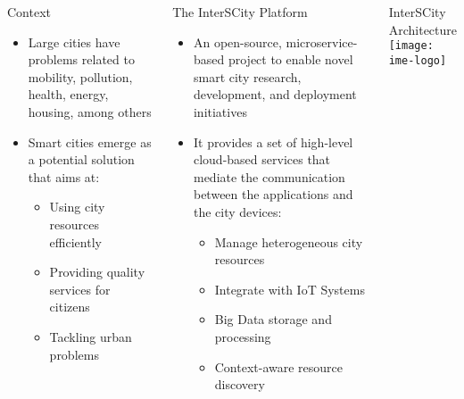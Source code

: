 \begin{frame}[fragile]
\begin{columns}[T]
  \begin{block}{Context}
    \begin{itemize}
      \item Large cities have problems related to mobility, pollution,
            health, energy, housing, among others
      \item Smart cities emerge as a potential solution that aims at:
      \begin{itemize}
        \item Using city resources efficiently
        \item Providing quality services for citizens
        \item Tackling urban problems
      \end{itemize}
    \end{itemize}
  \end{block}

  \begin{block}{The InterSCity Platform}
    \begin{itemize}
      \item An open-source, microservice-based project to enable novel
            smart city research, development, and deployment initiatives
      \item It provides a set of high-level cloud-based services that
            mediate the communication between the applications and the
            city devices:
      \begin{itemize}
        \item Manage heterogeneous city resources
        \item Integrate  with IoT Systems
        \item Big Data storage and processing
        \item Context-aware resource discovery
      \end{itemize}
    \end{itemize}
  \end{block}

  \halfcol

  \begin{block}{InterSCity Architecture}
      \centering
      \texttt{[image: ime-logo]}
  \end{block}

\end{columns}

\vspace*{.5\baselineskip}


\end{frame}
